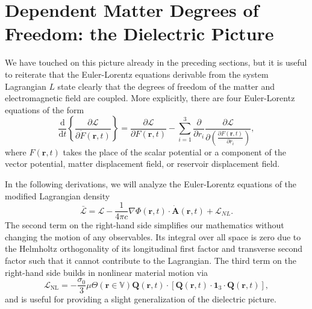
\section{Dependent Matter Degrees of Freedom: the Dielectric Picture}\label{app:dependentMatter}

We have touched on this picture already in the preceding sections, but it is useful to reiterate that the Euler-Lorentz equations derivable from the system Lagrangian $L$ state clearly that the degrees of freedom of the matter and electromagnetic field are coupled. More explicitly, there are four Euler-Lorentz equations of the form
\begin{equation}
\frac{\mathrm{d}}{\mathrm{d}t}\left\{\frac{\partial\mathcal{L}}{\partial\dot{F}(\mathbf{r},t)}\right\} = \frac{\partial\mathcal{L}}{\partial F(\mathbf{r},t)} - \sum_{i = 1}^3\frac{\partial}{\partial r_i}\frac{\partial\mathcal{L}}{\partial\left(\frac{\partial F(\mathbf{r},t)}{\partial r_i}\right)},
\end{equation}
where $F(\mathbf{r},t)$ takes the place of the scalar potential or a component of the vector potential, matter displacement field, or reservoir displacement field. 

In the following derivations, we will analyze the Euler-Lorentz equations of the modified Lagrangian density
\begin{equation}
\bar{\mathcal{L}} = \mathcal{L} - \frac{1}{4\pi c}\nabla\Phi(\mathbf{r},t)\cdot\dot{\mathbf{A}}(\mathbf{r},t) + \mathcal{L}_{NL}.
\end{equation}
The second term on the right-hand side simplifies our mathematics without changing the motion of any observables. Its integral over all space is zero due to the Helmholtz orthogonality of its longitudinal first factor and transverse second factor such that it cannot contribute to the Lagrangian. The third term on the right-hand side builds in nonlinear material motion via
\begin{equation}
\mathcal{L}_\mathrm{NL} = - \frac{\sigma_0}{3}\mu\Theta(\mathbf{r}\in\mathbb{V})\mathbf{Q}(\mathbf{r},t)\cdot\left[\mathbf{Q}(\mathbf{r},t)\cdot\bm{1}_3\cdot\mathbf{Q}(\mathbf{r},t)\right],
\end{equation}
and is useful for providing a slight generalization of the dielectric picture.

